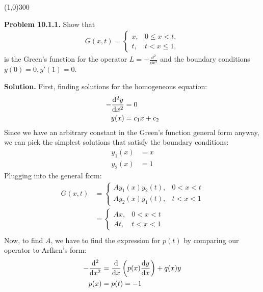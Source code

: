 \documentclass{article}
\begin{document}
\begin{center}
\line(1,0){300}
\end{center}
\textbf{Problem 10.1.1.} Show that
\begin{equation*}
\begin{aligned}
	G(x,t) =
	\begin{cases}
  		x, & 0 \leq x < t, \\
  		t, & t < x \leq 1,    
	\end{cases}
\end{aligned}
\end{equation*}
is the Green's function for the operator $L = -\frac{\dd\phantom{}^2}{\dd x^2}$ and the boundary conditions $y(0) = 0, y'(1) = 0$.

\textbf{Solution.} First, finding solutions for the homogeneous equation:
\begin{equation*}
\begin{aligned}
	-\dv[2]{y}{x} &= 0 \\
	y(x) &= c_1 x + c_2
\end{aligned}
\end{equation*}
Since we have an arbitrary constant in the Green's function general form anyway, we can pick the simplest solutions that satisfy the boundary conditions:
\begin{equation*}
\begin{aligned}
	y_1(x) &= x \\
	y_2(x) &= 1
\end{aligned}
\end{equation*}
Plugging into the general form:
\begin{equation*}
\begin{aligned}
	G(x,t) &=
	\begin{cases}
		Ay_1(x)y_2(t), & 0<x<t \\
		Ay_2(x)y_1(t), & t<x<1
	\end{cases} \\
	&= 
	\begin{cases}
		Ax, & 0<x<t \\
		At, & t<x<1
	\end{cases} \\
\end{aligned}
\end{equation*}
Now, to find $A$, we have to find the expression for $p(t)$ by comparing our operator to Arfken's form:
\begin{equation*}
\begin{aligned}
	-\dv[2]{}{x} &= \dv{}{x}\left(p(x)\dv{y}{x}\right) + q(x)y \\
	p(x) &= p(t) = -1
\end{aligned}
\end{equation*}
\end{document}
